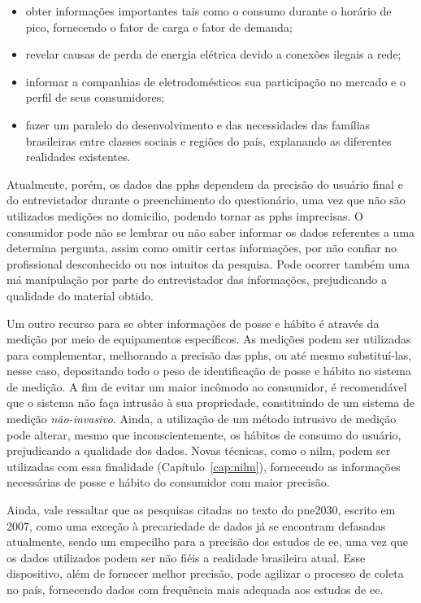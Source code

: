 \begin{itemize}
\item obter informações importantes tais como o consumo durante o
horário de pico, fornecendo o fator de carga e fator de demanda;
\item revelar causas de perda de energia elétrica devido a conexões
ilegais a rede;
\item informar a companhias de eletrodomésticos sua participação no
mercado e o perfil de seus consumidores;
\item fazer um paralelo do desenvolvimento e das necessidades das famílias
brasileiras entre classes sociais e regiões do país, explanando as
diferentes realidades existentes.
\end{itemize}

Atualmente, porém, os dados das \glspl{pph} dependem da precisão do
usuário final e do entrevistador durante o preenchimento do
questionário, uma vez que não são utilizados medições no domicilio,
podendo tornar as \glspl{pph} imprecisas. O consumidor pode não se
lembrar ou não saber informar os dados referentes a uma determina
pergunta, assim como omitir certas informações, por não confiar no
profissional desconhecido ou nos intuitos da pesquisa.  Pode ocorrer
também uma má manipulação por parte do entrevistador das informações,
prejudicando a qualidade do material obtido.

Um outro recurso para se obter informações de posse e hábito é através
da medição por meio de equipamentos específicos. As medições podem ser
utilizadas para complementar, melhorando a precisão das \glspl{pph},
ou até mesmo substituí-las, nesse caso, depositando todo o peso de
identificação de posse e hábito no sistema de medição. A fim de evitar
um maior incômodo ao consumidor, é recomendável que o sistema não faça
intrusão à sua propriedade, constituindo de um sistema de medição
\emph{não-invasivo}. Ainda, a utilização de um método intrusivo de
medição pode alterar, mesmo que inconscientemente, os hábitos de
consumo do usuário, prejudicando a qualidade dos dados.  Novas
técnicas, como o \gls{nilm}, podem ser utilizadas com essa
finalidade (Capítulo~\ref{cap:nilm}), fornecendo as informações
necessárias de posse e hábito do consumidor com maior precisão.

Ainda, vale ressaltar que as pesquisas citadas no texto do
\gls{pne2030}, escrito em 2007, como uma exceção à precariedade de
dados já se encontram defasadas atualmente, sendo um empecilho para a
precisão dos estudos de \gls{ee}, uma vez que os dados utilizados
podem ser não fiéis a realidade brasileira atual.  Esse dispositivo,
além de fornecer melhor precisão, pode agilizar o processo de coleta
no país, fornecendo dados com frequência mais adequada aos estudos de
\gls{ee}.
